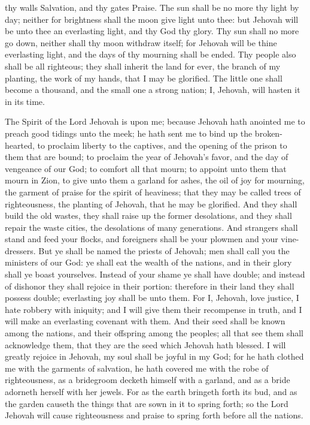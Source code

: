 thy walls Salvation, and thy gates Praise. The sun shall be no more thy light by day; neither for brightness shall the moon give light unto thee: but Jehovah will be unto thee an everlasting light, and thy God thy glory. Thy sun shall no more go down, neither shall thy moon withdraw itself; for Jehovah will be thine everlasting light, and the days of thy mourning shall be ended. Thy people also shall be all righteous; they shall inherit the land for ever, the branch of my planting, the work of my hands, that I may be glorified. The little one shall become a thousand, and the small one a strong nation; I, Jehovah, will hasten it in its time. 

The Spirit of the Lord Jehovah is upon me; because Jehovah hath anointed me to preach good tidings unto the meek; he hath sent me to bind up the broken-hearted, to proclaim liberty to the captives, and the opening of the prison to them that are bound; to proclaim the year of Jehovah’s favor, and the day of vengeance of our God; to comfort all that mourn; to appoint unto them that mourn in Zion, to give unto them a garland for ashes, the oil of joy for mourning, the garment of praise for the spirit of heaviness; that they may be called trees of righteousness, the planting of Jehovah, that he may be glorified.  And they shall build the old wastes, they shall raise up the former desolations, and they shall repair the waste cities, the desolations of many generations. And strangers shall stand and feed your flocks, and foreigners shall be your plowmen and your vine-dressers. But ye shall be named the priests of Jehovah; men shall call you the ministers of our God: ye shall eat the wealth of the nations, and in their glory shall ye boast yourselves. Instead of your shame ye shall have double; and instead of dishonor they shall rejoice in their portion: therefore in their land they shall possess double; everlasting joy shall be unto them. For I, Jehovah, love justice, I hate robbery with iniquity; and I will give them their recompense in truth, and I will make an everlasting covenant with them. And their seed shall be known among the nations, and their offspring among the peoples; all that see them shall acknowledge them, that they are the seed which Jehovah hath blessed.  I will greatly rejoice in Jehovah, my soul shall be joyful in my God; for he hath clothed me with the garments of salvation, he hath covered me with the robe of righteousness, as a bridegroom decketh himself with a garland, and as a bride adorneth herself with her jewels. For as the earth bringeth forth its bud, and as the garden causeth the things that are sown in it to spring forth; so the Lord Jehovah will cause righteousness and praise to spring forth before all the nations. 

